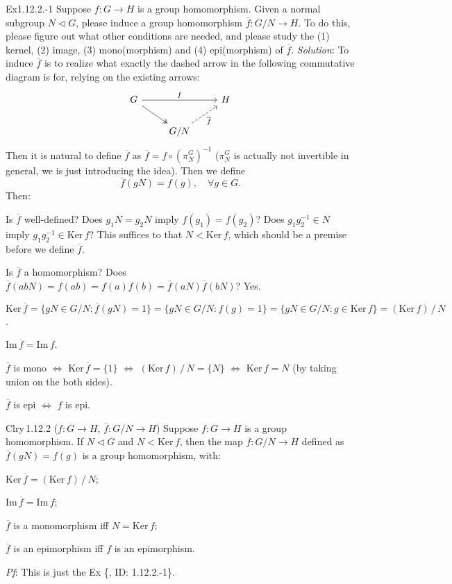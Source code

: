 \documentclass{article}
\newcommand{\nles}{\vartriangleleft}
\newcommand{\Ker}{\text{Ker}\,}
\newcommand{\Ima}{\text{Im}\,}
\begin{document}
\begin{Th}{Ex1.12.2.-1}
    Suppose $f: G\to H$ is a group homomorphism. Given a normal subgroup $N\nles G$, please induce a group homomorphism $\overline{f}: G/N\to H$. To do this, please figure out what other conditions are needed, and please study the (1) kernel, (2) image, (3) mono(morphism) and (4) epi(morphism) of $\overline{f}$.
    \tcblower
    \textit{Solution}: To induce $\overline{f}$ is to realize what exactly the dashed arrow in the following commutative diagram is for, relying on the existing arrows:
    $$ \begin{tikzcd}
        G \arrow[rr, "f"] \arrow[rd, two heads] & & H \\
        & G/N \arrow[ru, dashed, "\overline{f}"'] &
    \end{tikzcd} $$
    Then it is natural to define $\overline{f}$ as $\overline{f} = f\circ(\pi_N^G)^{-1}$ ($\pi_N^G$ is actually not invertible in general, we is just introducing the idea). Then we define
    $$ \overline{f}(gN) = f(g), \quad \forall g\in G. $$
    Then:
    \begin{compactenum}
        \item Is $\overline{f}$ well-defined? Does $g_1N = g_2N$ imply $f(g_1) = f(g_2)$? Does $g_1g_2^{-1}\in N$ imply $g_1g_2^{-1}\in\Ker f$? \textcolor{P}{This suffices to that $N<\Ker f$}, which should be a premise before we define $\overline{f}$.
        \item Is $\overline{f}$ a homomorphism? Does $\overline{f}(abN) = f(ab) = f(a)f(b) = \overline{f}(aN)\overline{f}(bN)$? Yes.
        \item $ \Ker \overline{f} = \{gN\in G/N: \overline{f}(gN) = 1\} = \{gN\in G/N: f(g) = 1\} = \{gN\in G/N: g\in\Ker f\} = (\Ker f)\,/\,N $.
        \item $ \Ima \overline{f} = \Ima f $.
        \item $\overline{f}$ is mono $\Longleftrightarrow$ $\Ker \overline{f} = \{1\}$ $\Longleftrightarrow$ $(\Ker f)\,/\,N = \{N\}$ $\Longleftrightarrow$ $\Ker f = N$ (by taking union on the both sides).
        \item $\overline{f}$ is epi $\Longleftrightarrow$ $f$ is epi. 
    \end{compactenum}
\end{Th}

\begin{Th}{Clry\,1.12.2 ($f: G\to H$, $\overline{f}: G/N\to H$)}
    Suppose $f: G\to H$ is a group homomorphism. If $N\nles G$ and $N<\Ker f$, then the map $\overline{f}: G/N\to H$ defined as $\overline{f}(gN) = f(g)$ is a group homomorphism, with:
    \begin{compactenum}
        \item $\Ker \overline{f} = (\Ker f)\,/\,N$;
        \item $\Ima \overline{f} = \Ima f$;
        \item $\overline{f}$ is a monomorphism iff $N = \Ker f$;
        \item $\overline{f}$ is an epimorphism iff $f$ is an epimorphism.
    \end{compactenum}
    \tcblower
    \textit{Pf}: This is just the Ex \{, ID: 1.12.2.-1\}.
\end{Th}
\end{document}
